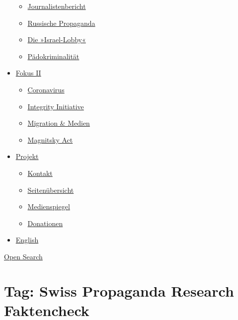 \begin{itemize}
  \begin{itemize}
  \tightlist
  \item
    \href{https://swprs.org/bericht-eines-journalisten/}{Journalistenbericht}
  \item
    \href{https://swprs.org/russische-propaganda/}{Russische Propaganda}
  \item
    \href{https://swprs.org/die-israel-lobby-fakten-und-mythen/}{Die
    »Israel-Lobby«}
  \item
    \href{https://swprs.org/geopolitik-und-paedokriminalitaet/}{Pädokriminalität}
  \end{itemize}
\item
  \href{https://swprs.org/migration-und-medien/}{Fokus II}

  \begin{itemize}
  \tightlist
  \item
    \href{https://swprs.org/covid-19-hinweis-ii/}{Coronavirus}
  \item
    \href{https://swprs.org/die-integrity-initiative/}{Integrity
    Initiative}
  \item
    \href{https://swprs.org/migration-und-medien/}{Migration \& Medien}
  \item
    \href{https://swprs.org/der-fall-magnitsky/}{Magnitsky Act}
  \end{itemize}
\item
  \href{https://swprs.org/kontakt/}{Projekt}

  \begin{itemize}
  \tightlist
  \item
    \href{https://swprs.org/kontakt/}{Kontakt}
  \item
    \href{https://swprs.org/uebersicht/}{Seitenübersicht}
  \item
    \href{https://swprs.org/medienspiegel/}{Medienspiegel}
  \item
    \href{https://swprs.org/donationen/}{Donationen}
  \end{itemize}
\item
  \href{https://swprs.org/contact/}{English}
\end{itemize}

\protect\hyperlink{}{Open Search}

\hypertarget{tag-swiss-propaganda-research-faktencheck}{%
\section{Tag: Swiss Propaganda Research
Faktencheck}\label{tag-swiss-propaganda-research-faktencheck}}

